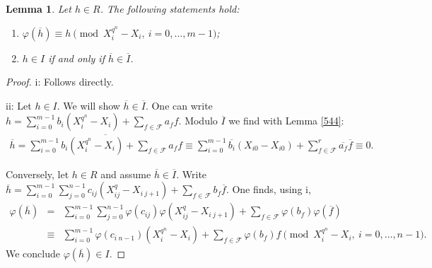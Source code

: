 \documentclass{amsart}
\theoremstyle{plain}
\newtheorem{lemma}[theorem]{Lemma}
\theoremstyle{definition}
\begin{document}
\begin{lemma} \label{943}
Let $h \in R$. The following statements hold:
\begin{enumerate}
\item $\varphi(\overline{h}) \equiv h \pmod{X_i^{q^n}-X_i,\ i=0,\ldots,m-1}$;
\item $h \in I$ if and only if $\overline{h} \in \overline{I}$.
\end{enumerate}
\end{lemma}
\begin{proof}
i: Follows directly.

ii: Let $h \in I$. We will show $\overline{h} \in \overline{I}$. One can write $h= \sum_{i=0}^{m-1} b_i (X_i^{q^n}-X_i) + \sum_{f \in \mathcal{F}} a_f f$. Modulo $\overline{I}$ we find with Lemma \ref{544}:
\begin{eqnarray*}
\overline{h} =\overline{  \sum_{i=0}^{m-1} b_i (X_i^{q^n}-X_i) + \sum_{f \in \mathcal{F}} a_f f} \equiv \sum_{i=0}^{m-1} \overline{b_i} (X_{i0}-X_{i0})+\sum_{f \in \mathcal{F}}^r \overline{a_f} \overline{f} \equiv 0.
\end{eqnarray*}

Conversely, let $h \in R$ and assume $\overline{h} \in \overline{I}$. 
Write $\overline{h}=  \sum_{i=0}^{m-1} \sum_{j=0}^{n-1} c_{ij} (X_{i j}^q-X_{i\ j+1})+ \sum_{f \in \mathcal{F}} b_f\overline{f}$. One finds, using i,
\begin{eqnarray*}
\varphi(\overline{h}) &=&   \sum_{i=0}^{m-1} \sum_{j=0}^{n-1} \varphi(c_{ij}) \varphi(X_{ij}^q-X_{i\ j+1})+  \sum_{f \in \mathcal{F}} \varphi(b_f) \varphi(\overline{f}) \\
&\equiv& \sum_{i=0}^{m-1} \varphi(c_{i\ n-1}) (X_i^{q^n}-X_i) +  \sum_{f \in \mathcal{F}} \varphi(b_f) f  \pmod{X_i^{q^n}-X_i,\ i=0,\ldots,n-1}.
\end{eqnarray*}
We conclude $\varphi(\overline{h}) \in I$. 
\end{proof}
\end{document}
